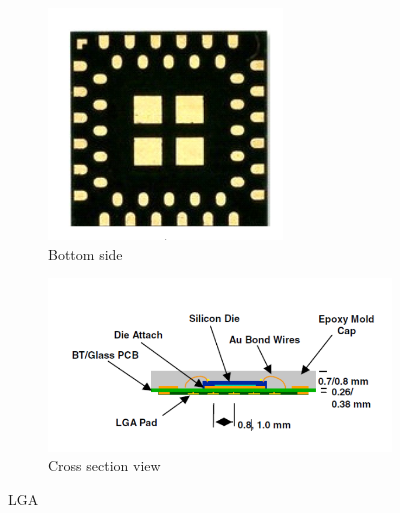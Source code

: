 \documentclass[final]{cubedoc}
\begin{document}
	
	\begin{figure}[h!]
		\centering
		\begin{subfigure}{.5\textwidth}
			\centering
			\includegraphics[keepaspectratio, width=0.7\linewidth]{docs/lga.png}
			\caption{Bottom side}
			\label{fig:sub1}
		\end{subfigure}%
		\begin{subfigure}{.5\textwidth}
			\centering
			\includegraphics[keepaspectratio, width=1.2\linewidth, height=.4\textheight]{docs/lga_cross.png}
			\caption{Cross section view}
			\label{fig:sub2}
		\end{subfigure}
		\caption{LGA}
		\label{fig:test}
	\end{figure}
	
	
	
\end{document}
